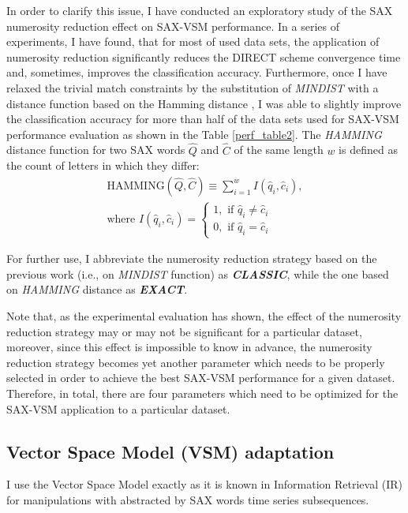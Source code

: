 In order to clarify this issue, I have conducted an exploratory study of the SAX numerosity reduction 
effect on SAX-VSM performance. In a series of experiments, I have found, that for most of used data sets, the application of 
numerosity reduction significantly reduces the DIRECT scheme convergence time and, sometimes, improves the classification accuracy. 
Furthermore, once I have relaxed the trivial match constraints by the substitution of 
\textit{MINDIST} with a distance function based on the Hamming distance \cite{hamming}, 
I was able to slightly improve the classification accuracy for more than half of the data sets used for \mbox{SAX-VSM}
performance evaluation as shown in the Table \ref{perf_table2}. 
The \textit{HAMMING} distance function for two SAX words $\hat{Q}$ and $\hat{C}$ of the same length $w$ 
is defined as the count of letters in which they differ:
\begin{equation}
\label{eq:hamming}
\begin{split}
\text{HAMMING}(\widehat{Q},\widehat{C}) \equiv \sum_{i=1}^{w} I( \widehat{q}_{i}, \widehat{c}_{i} ), \\
\text{where } I( \widehat{q}_{i}, \widehat{c}_{i} ) = 
\begin{cases}
 1,\text{ if } \widehat{q}_{i} \neq \widehat{c}_{i} \\
 0,\text{ if } \widehat{q}_{i} = \widehat{c}_{i}
\end{cases}
\end{split}                                                      
\end{equation}

For further use, I abbreviate the numerosity reduction strategy based on the previous work (i.e., on \textit{MINDIST} 
function) as \textit{\textbf{CLASSIC}}, while the one based on \textit{HAMMING} distance as \textit{\textbf{EXACT}}.

Note that, as the experimental evaluation has shown, the effect of the numerosity reduction strategy may or may not be significant 
for a particular dataset, moreover, since this effect is impossible to know in advance, the numerosity reduction strategy becomes 
yet another parameter which needs to be properly selected in order to achieve the best SAX-VSM performance for a given dataset. 
Therefore, in total, there are four parameters which need to be optimized for the SAX-VSM application to a particular dataset.

\subsection{Vector Space Model (VSM) adaptation}\label{vsm}
I use the Vector Space Model exactly as it is known in Information Retrieval (IR) \cite{citeulike:300428} for 
manipulations with abstracted by SAX words time series subsequences. 


